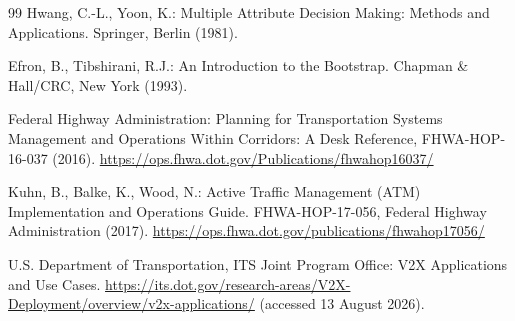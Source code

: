 \documentclass[runningheads]{llncs}
\begin{document}
\begin{thebibliography}{99}
Hwang, C.-L., Yoon, K.:
Multiple Attribute Decision Making: Methods and Applications.
Springer, Berlin (1981).

Efron, B., Tibshirani, R.J.:
An Introduction to the Bootstrap.
Chapman \& Hall/CRC, New York (1993).

Federal Highway Administration:
Planning for Transportation Systems Management and Operations Within Corridors: A Desk
Reference, FHWA-HOP-16-037 (2016).
\url{https://ops.fhwa.dot.gov/Publications/fhwahop16037/}

Kuhn, B., Balke, K., Wood, N.:
Active Traffic Management (ATM) Implementation and Operations Guide.
FHWA-HOP-17-056, Federal Highway Administration (2017).
\url{https://ops.fhwa.dot.gov/publications/fhwahop17056/}

U.S. Department of Transportation, ITS Joint Program Office:
V2X Applications and Use Cases.
\url{https://its.dot.gov/research-areas/V2X-Deployment/overview/v2x-applications/}
(accessed 13 August 2026).

\end{thebibliography}
\end{document}
